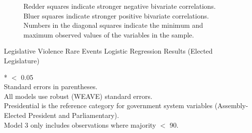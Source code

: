 \documentclass[a4paper]{article}\usepackage{graphicx, color}
\makeatletter
\newenvironment{kframe}{%
 \def\at@end@of@kframe{}%
 \ifinner\ifhmode%
  \def\at@end@of@kframe{\end{minipage}}%
  \begin{minipage}{\columnwidth}%
 \fi\fi%
 \def\FrameCommand##1{\hskip\@totalleftmargin \hskip-\fboxsep
 \colorbox{shadecolor}{##1}\hskip-\fboxsep
     \hskip-\linewidth \hskip-\@totalleftmargin \hskip\columnwidth}%
 \MakeFramed {\advance\hsize-\width
   \@totalleftmargin\z@ \linewidth\hsize
   \@setminipage}}%
 {\par\unskip\endMakeFramed%
 \at@end@of@kframe}
\makeatother
\begin{document}
{{\begin{landscape}
\begin{figure}[t]
\begin{center}





    \end{center}
    \begin{singlespace}
        {\scriptsize{Redder squares indicate stronger negative bivariate correlations. \\
        Bluer squares indicate stronger positive bivariate correlations. \\
        Numbers in the diagonal squares indicate the minimum and maximum observed values of the variables in the sample.
        }}
    \end{singlespace} 
\end{figure}
\end{landscape}


\begin{landscape}
\begin{table}[htp]
    \caption{Legislative Violence Rare Events Logistic Regression Results (Elected Legislature)}
    \label{outputTable.dem}
    \vspace{0.25cm}
    {\tiny{
    \begin{center}
\begin{kframe}


{\ttfamily\noindent\bfseries\color{errorcolor}{\#\# Error: unable to find an inherited method for function 'extract' for signature '"zelig"'}}\end{kframe}

    \end{center}
    \begin{singlespace}
        {*} $<$ 0.05 \\
        Standard errors in parentheses. \\
        All models use robust (WEAVE) standard errors. \\
        Presidential is the reference category for government system variables (Assembly-Elected President and Parliamentary). \\
        Model 3 only includes observations where majority $<$ 90.
    \end{singlespace}
    }}
\end{table}
\end{landscape}

}}
\end{document}
